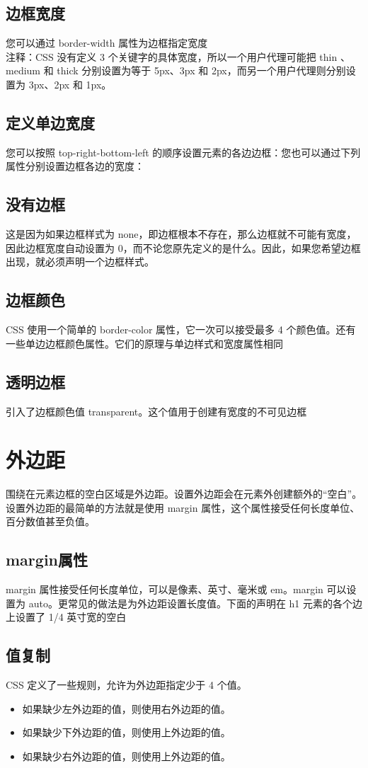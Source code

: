 \documentclass[10pt,UTF8]{ctexart}
\begin{document}
\subsection{边框宽度}
您可以通过 border-width 属性为边框指定宽度\\
注释：CSS 没有定义 3 个关键字的具体宽度，所以一个用户代理可能把 thin 、medium 和 thick 分别设置为等于 5px、3px 和 2px，而另一个用户代理则分别设置为 3px、2px 和 1px。
\subsection{定义单边宽度}
您可以按照 top-right-bottom-left 的顺序设置元素的各边边框：您也可以通过下列属性分别设置边框各边的宽度：
\subsection{没有边框}
这是因为如果边框样式为 none，即边框根本不存在，那么边框就不可能有宽度，因此边框宽度自动设置为 0，而不论您原先定义的是什么。因此，如果您希望边框出现，就必须声明一个边框样式。
\subsection{边框颜色}
CSS 使用一个简单的 border-color 属性，它一次可以接受最多 4 个颜色值。还有一些单边边框颜色属性。它们的原理与单边样式和宽度属性相同
\subsection{透明边框}
引入了边框颜色值 transparent。这个值用于创建有宽度的不可见边框
\section{外边距}
围绕在元素边框的空白区域是外边距。设置外边距会在元素外创建额外的“空白”。设置外边距的最简单的方法就是使用 margin 属性，这个属性接受任何长度单位、百分数值甚至负值。
\subsection{margin属性}
margin 属性接受任何长度单位，可以是像素、英寸、毫米或 em。margin 可以设置为 auto。更常见的做法是为外边距设置长度值。下面的声明在 h1 元素的各个边上设置了 1/4 英寸宽的空白
\subsection{值复制}
CSS 定义了一些规则，允许为外边距指定少于 4 个值。
\begin{itemize}
\item 如果缺少左外边距的值，则使用右外边距的值。
\item 如果缺少下外边距的值，则使用上外边距的值。
\item 如果缺少右外边距的值，则使用上外边距的值。
\end{itemize}
\end{document}
